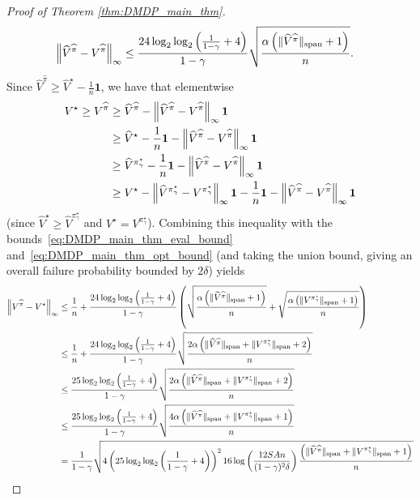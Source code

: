 \documentclass{article}
\theoremstyle{plain}
\theoremstyle{plain}
\theoremstyle{remark}
\theoremstyle{plain}
\theoremstyle{plain}
\newcommand{\Vhat}{\widehat{V}}
\newcommand{\pistar}{\pi^\star}
\newcommand{\one}{\mathbf{1}}
\newcommand{\pihat}{\widehat{\pi}}
\begin{document}
\begin{proof}[Proof of Theorem \ref{thm:DMDP_main_thm}]
    \begin{align}
        \infnorm{ \Vhat^{\pihat} - V^{\pihat}} &\leq  \frac{24 \log_2 \log_2 \left( \frac{1}{1-\gamma} + 4\right)  }{1-\gamma}\sqrt{\frac{ \alpha \left( \spannorm{\Vhat^{\pihat}} + 1\right)}{n}}.\label{eq:DMDP_main_thm_opt_bound}
    \end{align}
    Since $\Vhat^{\pihat} \geq \Vhat^\star - \frac{1}{n}\one$, we have that elementwise
    \begin{align}
        V^\star \geq V^{\pihat} &\geq \Vhat^{\pihat} - \infnorm{\Vhat^{\pihat} - V^{\pihat}} \one \nonumber\\
        & \geq \Vhat^\star - \frac{1}{n}\one - \infnorm{\Vhat^{\pihat} - V^{\pihat}} \one \nonumber\\
        & \geq \Vhat^{\pistar_\gamma} - \frac{1}{n}\one - \infnorm{\Vhat^{\pihat} - V^{\pihat}} \one \nonumber\\
        & \geq V^\star - \infnorm{\Vhat^{\pistar_\gamma} - V^{\pistar_\gamma}} \one - \frac{1}{n}\one - \infnorm{\Vhat^{\pihat} - V^{\pihat}} \one \label{eq:DMDP_chain_of_val_fn_bounds}
    \end{align}
    (since $\Vhat^\star \geq \Vhat^{\pistar_\gamma}$ and $V^\star = V^{\pistar_\gamma}$). Combining this inequality with the bounds~\eqref{eq:DMDP_main_thm_eval_bound} and~\eqref{eq:DMDP_main_thm_opt_bound} (and taking the union bound, giving an overall failure probability bounded by $2\delta$) yields
    \begin{align*}
        \infnorm{V^{\pihat} - V^\star} & \leq \frac{1}{n}+ \frac{24 \log_2 \log_2 \left( \frac{1}{1-\gamma} + 4\right)  }{1-\gamma}\left(\sqrt{\frac{ \alpha \left( \spannorm{\Vhat^{\pihat}} + 1\right)}{n}} + \sqrt{\frac{ \alpha \left( \spannorm{V^{\pistar_\gamma}} + 1\right)}{n}} \right) \\
        & \leq \frac{1}{n}+ \frac{24 \log_2 \log_2 \left( \frac{1}{1-\gamma} + 4\right)  }{1-\gamma}\sqrt{\frac{2 \alpha \left( \spannorm{\Vhat^{\pihat}} +\spannorm{V^{\pistar_\gamma}}+ 2\right)}{n}} \\
        & \leq  \frac{25 \log_2 \log_2 \left( \frac{1}{1-\gamma} + 4\right)  }{1-\gamma}\sqrt{\frac{2 \alpha \left( \spannorm{\Vhat^{\pihat}} +\spannorm{V^{\pistar_\gamma}}+ 2\right)}{n}} \\
        & \leq  \frac{25 \log_2 \log_2 \left( \frac{1}{1-\gamma} + 4\right)  }{1-\gamma}\sqrt{\frac{4 \alpha \left( \spannorm{\Vhat^{\pihat}} +\spannorm{V^{\pistar_\gamma}}+ 1\right)}{n}} \\
        &= \frac{1  }{1-\gamma}\sqrt{4\left(25 \log_2 \log_2 \left( \frac{1}{1-\gamma} + 4\right)\right)^2 16 \log \left(\frac{12 SA n}{(1-\gamma)^2\delta}  \right)\frac{ \left( \spannorm{\Vhat^{\pihat}} +\spannorm{V^{\pistar_\gamma}}+ 1\right)}{n}} \\

\end{align*}
\end{proof}
\end{document}
